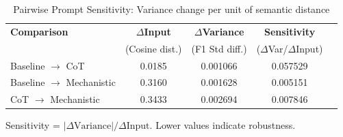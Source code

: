 \begin{table}[htbp]
\centering
\caption{Pairwise Prompt Sensitivity: Variance change per unit of semantic distance}
\label{tab:pairwise_sensitivity}
\begin{tabular}{lcccc}
\toprule
\textbf{Comparison} & \textbf{$\Delta$Input} & \textbf{$\Delta$Variance} & \textbf{Sensitivity} \\
 & (Cosine dist.) & (F1 Std diff.) & ($\Delta$Var/$\Delta$Input) \\
\midrule
Baseline $\rightarrow$ CoT & 0.0185 & 0.001066 & 0.057529 \\
Baseline $\rightarrow$ Mechanistic & 0.3160 & 0.001628 & 0.005151 \\
CoT $\rightarrow$ Mechanistic & 0.3433 & 0.002694 & 0.007846 \\
\bottomrule
\end{tabular}
\begin{tablenotes}
\small
\item Sensitivity = $|\Delta\text{Variance}| / \Delta\text{Input}$. Lower values indicate robustness.
\end{tablenotes}
\end{table}